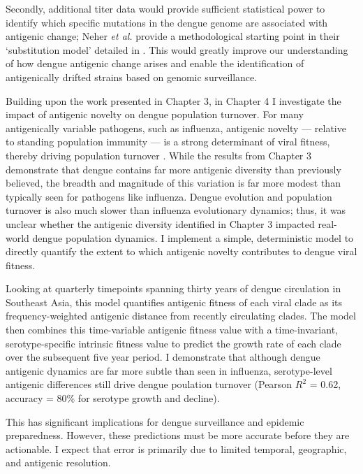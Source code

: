 Secondly, additional titer data would provide sufficient statistical power to identify which specific mutations in the dengue genome are associated with antigenic change; Neher \textit{et al.} provide a methodological starting point in their `substitution model' detailed in \citep{neher2016prediction}.
This would greatly improve our understanding of how dengue antigenic change arises and enable the identification of antigenically drifted strains based on genomic surveillance.

Building upon the work presented in Chapter 3, in Chapter 4 I investigate the impact of antigenic novelty on dengue population turnover.
For many antigenically variable pathogens, such as influenza, antigenic novelty --- relative to standing population immunity --- is a strong determinant of viral fitness, thereby driving population turnover \citep{bedford2012canalization, zhang2005clade}.
While the results from Chapter 3 demonstrate that dengue contains far more antigenic diversity than previously believed, the breadth and magnitude of this variation is far more modest than typically seen for pathogens like influenza.
Dengue evolution and population turnover is also much slower than influenza evolutionary dynamics; thus, it was unclear whether the antigenic diversity identified in Chapter 3 impacted real-world dengue population dynamics.
I implement a simple, deterministic model to directly quantify the extent to which antigenic novelty contributes to dengue viral fitness.

Looking at quarterly timepoints spanning thirty years of dengue circulation in Southeast Asia, this model quantifies antigenic fitness of each viral clade as its frequency-weighted antigenic distance from recently circulating clades.
The model then combines this time-variable antigenic fitness value with a time-invariant, serotype-specific intrinsic fitness value to predict the growth rate of each clade over the subsequent five year period.
I demonstrate that although dengue antigenic dynamics are far more subtle than seen in influenza, serotype-level antigenic differences still drive dengue poulation turnover (Pearson $R^2$ = 0.62, accuracy = 80\% for serotype growth and decline).

This has significant implications for dengue surveillance and epidemic preparedness.
However, these predictions must be more accurate before they are actionable.
I expect that error is primarily due to limited temporal, geographic, and antigenic resolution.

